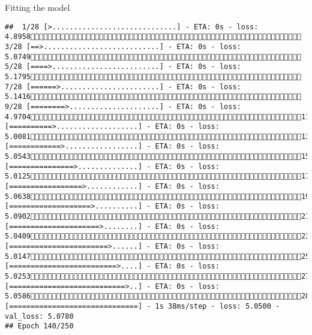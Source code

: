 \documentclass[
  ignorenonframetext,
]{beamer}
\begin{document}
\begin{frame}[fragile]{Fitting the model}
\begin{verbatim}
##  1/28 [>.............................] - ETA: 0s - loss: 4.8958 3/28 [==>...........................] - ETA: 0s - loss: 5.0749 5/28 [====>.........................] - ETA: 0s - loss: 5.1795 7/28 [======>.......................] - ETA: 0s - loss: 5.1416 9/28 [========>.....................] - ETA: 0s - loss: 4.970411/28 [==========>...................] - ETA: 0s - loss: 5.008113/28 [============>.................] - ETA: 0s - loss: 5.054315/28 [===============>..............] - ETA: 0s - loss: 5.012517/28 [=================>............] - ETA: 0s - loss: 5.063819/28 [===================>..........] - ETA: 0s - loss: 5.090221/28 [=====================>........] - ETA: 0s - loss: 5.040923/28 [=======================>......] - ETA: 0s - loss: 5.014725/28 [=========================>....] - ETA: 0s - loss: 5.025327/28 [===========================>..] - ETA: 0s - loss: 5.058628/28 [==============================] - 1s 38ms/step - loss: 5.0500 - val_loss: 5.0780
## Epoch 140/250

\end{verbatim}
\end{frame}
\end{document}
